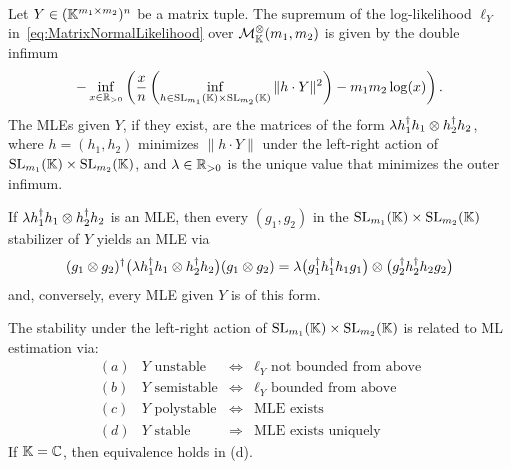 \begin{theorem}\label{thm:bigTheoremMatrixNormal}
	\ \\
	Let $Y \in (\mathbb K^{m_1 \times m_2})^n$ be a matrix tuple.
	The supremum of the log-likelihood $\ell_Y$ in~\eqref{eq:MatrixNormalLikelihood} over $\mathcal{M}^{\otimes}_{\mathbb{K}}(m_1, m_2)$ is given by the double infimum
	\begin{equation} \label{eq:MatrixNormalDoubleInf}
		-\inf_{x \in \mathbb R_{>0} } \left( \frac{x}{n} \left( \inf_{h \in \operatorname{SL}_{m_1}(\mathbb K) \times \operatorname{SL}_{m_2}(\mathbb K)} \| h \cdot Y \|^2 \right) -  m_1 m_2 \log (x) \right) .
	\end{equation}  
	The MLEs given $Y$, if they exist, are the matrices of the form $\lambda h_1^{\dagger} h_1 \otimes h_2^{\dagger} h_2$, where $h = (h_1,h_2)$ minimizes $\| h \cdot Y \|$ under the left-right action of $\operatorname{SL}_{m_1}(\mathbb K) \times \operatorname{SL}_{m_2}(\mathbb K)$, and $\lambda \in \mathbb R_{>0}$ is the unique value that minimizes the outer infimum. 
	
	If $\lambda h_1^{\dagger} h_1 \otimes h_2^{\dagger} h_2$ is an MLE, then every $(g_1,g_2)$ in the $\operatorname{SL}_{m_1}(\mathbb K) \times \operatorname{SL}_{m_2}(\mathbb K)$ stabilizer of $Y$ yields an MLE via
		\[ (g_1 \otimes g_2)^{\dagger} \big( \lambda h_1^{\dagger} h_1 \otimes h_2^{\dagger} h_2 \big) (g_1 \otimes g_2) =
		\lambda \big( g_1^{\dagger} h_1^{\dagger} h_1 g_1 \big) \otimes \big( g_2^{\dagger} h_2^{\dagger} h_2 g_2 \big) \]
	and, conversely, every MLE given $Y$ is of this form.
	
	The stability under the left-right action of $\operatorname{SL}_{m_1}(\mathbb K) \times \operatorname{SL}_{m_2}(\mathbb K)$ is related to ML estimation via:
	\[ \begin{matrix} 
		(a) & Y \text{ unstable} & \Leftrightarrow & \ell_Y \text{ not bounded from above} \\
		(b) & Y \text{ semistable} & \Leftrightarrow & \ell_Y \text{ bounded from above} \\ 
		(c) & Y \text{ polystable} & \Leftrightarrow & \text{MLE exists}
		\\
		(d) & Y \text{ stable} & \Rightarrow & \text{MLE exists  uniquely}
	\end{matrix}
	\]
	If $\mathbb K = \mathbb C$, then equivalence holds in (d).
\end{theorem}

